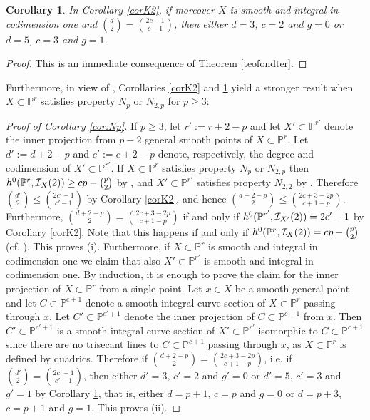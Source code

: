 \documentclass{amsart}
\newtheorem{corollary}{Corollary}
\theoremstyle{definition}
\begin{document}
\begin{corollary}\label{corfin}
In Corollary \ref{corK2}, if moreover $X$ is smooth and integral in
codimension one and $\binom{d}{2}=\binom{2c-1}{c-1}$, then either
$d=3$, $c=2$ and $g=0$ or $d=5$, $c=3$ and $g=1$.
\end{corollary}

\begin{proof}
This is an immediate consequence of Theorem \ref{teofondter}.
\end{proof}

Furthermore, in view of \cite{h-k}, Corollaries \ref{corK2} and
\ref{corfin} yield a stronger result when $X\subset{{\mathbb P}}^r$ satisfies
property $N_p$ or $N_{2,p}$ for $p\geq 3$:

\begin{proof}[Proof of Corollary \ref{cor:Np}]
If $p\geq 3$, let $r':=r+2-p$ and let $X'\subset{{\mathbb P}}^{r'}$ denote the
inner projection from $p-2$ general smooth points of $X\subset{{\mathbb P}}^r$.
Let $d':=d+2-p$ and $c':=c+2-p$ denote, respectively, the degree and
codimension of $X'\subset{{\mathbb P}}^{r'}$. If $X\subset{{\mathbb P}}^r$ satisfies
property $N_p$ or $N_{2,p}$ then
$h^0(\Bbb{P}^{r},\mathcal{I}_X(2))\geq cp-\binom{p}{2}$ by
\cite[Corollary 3.7]{h-k}, and $X'\subset{{\mathbb P}}^{r'}$ satisfies property
$N_{2,2}$ by \cite[Corollary 3.3]{h-k}. Therefore
$\binom{d'}{2}\leq\binom{2c'-1}{c'-1}$ by Corollary \ref{corK2}, and
hence $\binom{d+2-p}{2}\leq\binom{2c+3-2p}{c+1-p}$. Furthermore,
$\binom{d+2-p}{2}=\binom{2c+3-2p}{c+1-p}$ if and only if
$h^0(\Bbb{P}^{r'},\mathcal{I}_{X'}(2))=2c'-1$ by Corollary
\ref{corK2}. Note that this happens if and only if
$h^0(\Bbb{P}^{r},\mathcal{I}_X(2))=cp-\binom{p}{2}$ (cf.
\cite[Proposition 3.5]{h-k}). This proves (i). Furthermore, if
$X\subset{{\mathbb P}}^r$ is smooth and integral in codimension one we claim
that also $X'\subset{{\mathbb P}}^{r'}$ is smooth and integral in codimension
one. By induction, it is enough to prove the claim for the inner
projection of $X\subset{{\mathbb P}}^r$ from a single point. Let $x\in X$ be a
smooth general point and let $C\subset{{\mathbb P}}^{c+1}$ denote a smooth
integral curve section of $X\subset{{\mathbb P}}^r$ passing through $x$. Let
$C'\subset{{\mathbb P}}^{c'+1}$ denote the inner projection of
$C\subset{{\mathbb P}}^{c+1}$ from $x$. Then $C'\subset{{\mathbb P}}^{c'+1}$ is a smooth
integral curve section of $X'\subset{{\mathbb P}}^{r'}$ isomorphic to
$C\subset{{\mathbb P}}^{c+1}$ since there are no trisecant lines to
$C\subset{{\mathbb P}}^{c+1}$ passing through $x$, as $X\subset{{\mathbb P}}^r$ is defined
by quadrics. Therefore if $\binom{d+2-p}{2}=\binom{2c+3-2p}{c+1-p}$,
i.e. if $\binom{d'}{2}=\binom{2c'-1}{c'-1}$, then either $d'=3$,
$c'=2$ and $g'=0$ or $d'=5$, $c'=3$ and $g'=1$ by Corollary
\ref{corfin}, that is, either $d=p+1$, $c=p$ and $g=0$ or $d=p+3$,
$c=p+1$ and $g=1$. This proves (ii).
\end{proof}
\end{document}
